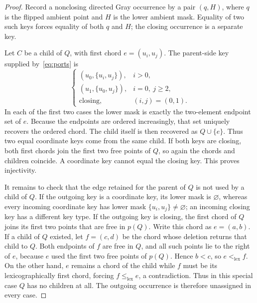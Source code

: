 \documentclass[12pt]{article}
\begin{document}
\begin{proof}
Record a nonclosing directed Gray occurrence by a pair $(q,H)$, where $q$ is
the flipped ambient point and $H$ is the lower ambient mask.  Equality of two
such keys forces equality of both $q$ and $H$; the closing occurrence is a
separate key.

Let $C$ be a child of $Q$, with first chord $e=(u_i,u_j)$.  The parent-side
key supplied by~\eqref{eq:ports} is
\[
 \begin{cases}
  (u_0,\{u_i,u_j\}),&i>0,\\
  (u_1,\{u_0,u_j\}),&i=0,\ j\geq2,\\
  \text{closing},&(i,j)=(0,1).
 \end{cases}
\]
In each of the first two cases the lower mask is exactly the two-element
endpoint set of $e$.  Because the endpoints are ordered increasingly, that
set uniquely recovers the ordered chord.  The child itself is then recovered
as $Q\cup\{e\}$.  Thus two equal coordinate keys come from the same child.
If both keys are closing, both first chords join the first two free points of
$Q$, so again the chords and children coincide.  A coordinate key cannot
equal the closing key.  This proves injectivity.

It remains to check that the edge retained for the parent of $Q$ is not used
by a child of $Q$.  If the outgoing key is a coordinate key, its lower mask
is $\varnothing$, whereas every incoming coordinate key has lower mask
$\{u_i,u_j\}\neq\varnothing$; an incoming closing key has a different key
type.  If the outgoing key is closing, the first chord of $Q$ joins its first
two points that are free in $p(Q)$.  Write this chord as $e=(a,b)$.  If a
child of $Q$ existed, let $f=(c,d)$ be the chord whose deletion returns that
child to $Q$.
Both endpoints of $f$ are free in $Q$, and all such points lie to the right of
$e$, because $e$ used the first two free points of $p(Q)$.  Hence
$b<c$, so $e<_{\mathrm{lex}}f$.  On the other hand, $e$ remains a chord
of the child while $f$ must be its lexicographically first chord, forcing
$f\leq_{\mathrm{lex}}e$, a contradiction.  Thus in this special case $Q$ has
no children at all.  The outgoing occurrence is therefore unassigned in
every case.
\end{proof}
\end{document}
